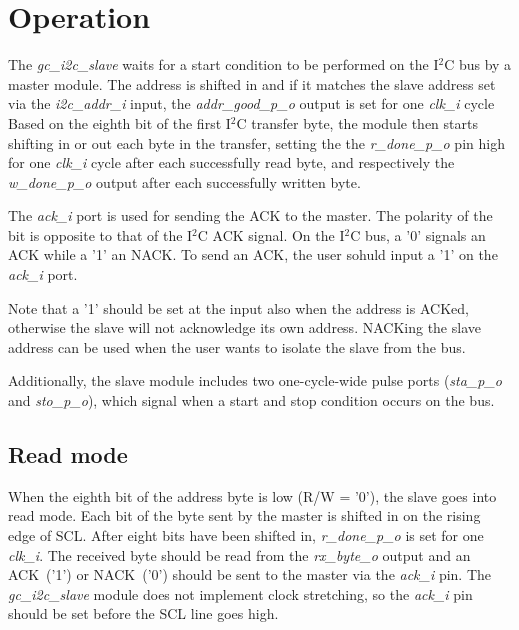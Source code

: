 \documentclass[a4paper,11pt]{article}
\begin{document}
\pagebreak
\section{Operation}
\label{sec:oper}

The \textit{gc\_i2c\_slave} waits for a start condition to be performed on the I$^2$C bus by a
master module. The address is shifted in and if it matches the slave address set via 
the \textit{i2c\_addr\_i} input, the \textit{addr\_good\_p\_o} output is set for one
\textit{clk\_i} cycle Based on the eighth bit of the first I$^2$C transfer byte, the module
then starts shifting in or out each byte in the transfer, setting the the \textit{r\_done\_p\_o}
pin high for one \textit{clk\_i} cycle after each successfully read byte, and respectively
the \textit{w\_done\_p\_o} output after each successfully written byte.

The \textit{ack\_i} port is used for sending the ACK to the master. The polarity of the bit
is opposite to that of the I$^2$C ACK signal. On the I$^2$C bus, a '0' signals an ACK while a '1'
an NACK. To send an ACK, the user sohuld input a '1' on the \textit{ack\_i} port. 

Note that a '1' should be set at the input also when the address is ACKed, otherwise the slave
will not acknowledge its own  address. NACKing the slave address can be used when the user
wants to isolate the slave from the bus.

Additionally, the slave module includes two one-cycle-wide pulse ports (\textit{sta\_p\_o} and
\textit{sto\_p\_o}), which signal when a start and stop condition occurs on the bus.

\subsection{Read mode}

When the eighth bit of the address byte is low (R/W = '0'), the slave goes into read
mode. Each bit of the byte sent by the master is shifted in on the rising edge of SCL. After 
eight bits have been shifted in, \textit{r\_done\_p\_o} is set for one \textit{clk\_i}.
The received byte should be read from the \textit{rx\_byte\_o} output and an ACK~('1') or
NACK~('0') should be sent to the master via the \textit{ack\_i} pin. The \textit{gc\_i2c\_slave}
module does not implement clock stretching, so the \textit{ack\_i} pin should be set before
the SCL line goes high.
\end{document}
